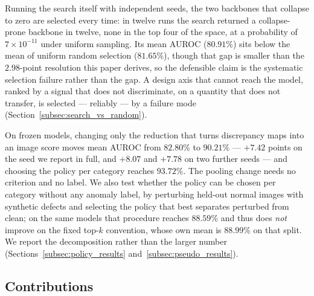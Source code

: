 Running the search itself with independent seeds, the two backbones that collapse
to zero are selected every time: in twelve runs the search returned a
collapse-prone backbone in twelve, none in the top four of the space, at a
probability of $7\times10^{-11}$ under uniform sampling. Its mean AUROC ($80.91\%$)
sits below the mean of uniform random selection ($81.65\%$), though that gap is
smaller than the $2.98$-point resolution this paper derives, so the defensible
claim is the systematic selection failure rather than the gap. A design axis that
cannot reach the
model, ranked by a signal that does not discriminate, on a quantity that does not
transfer, is selected --- reliably --- by a failure mode
(Section~\ref{subsec:search_vs_random}).

 On frozen models,
changing only the reduction that turns discrepancy maps into an image score moves
mean AUROC from $82.80\%$ to $90.21\%$ --- $+7.42$ points on the seed we report in
full, and $+8.07$ and $+7.78$ on two further seeds --- and choosing the
policy per category reaches $93.72\%$. The pooling change needs no criterion and
no label. We also test whether the policy can be chosen per category without any
anomaly label, by perturbing held-out normal images with synthetic defects and
selecting the policy that best separates perturbed from clean; on the same models
that procedure reaches $88.59\%$ and thus does \emph{not} improve on the fixed
top-$k$ convention, whose own mean is $88.99\%$ on that split. We report the
decomposition rather than the larger number
(Sections~\ref{subsec:policy_results} and~\ref{subsec:pseudo_results}).

\subsection*{Contributions}

